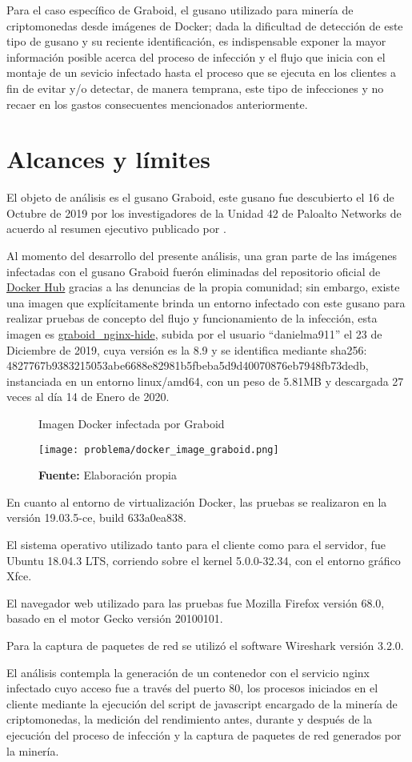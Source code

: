 \documentclass[../main/main.tex]{subfiles}
\begin{document}
  Para el caso específico de Graboid, el gusano utilizado para minería de criptomonedas desde imágenes de Docker; dada la dificultad de detección de este tipo de gusano y su reciente identificación, es indispensable exponer la mayor información posible acerca del proceso de infección y el flujo que inicia con el montaje de un sevicio infectado hasta el proceso que se ejecuta en los clientes a fin de evitar y/o detectar, de manera temprana, este tipo de infecciones y no recaer en los gastos consecuentes mencionados anteriormente.

  \section{Alcances y límites}

  El objeto de análisis es el gusano Graboid, este gusano fue descubierto el 16 de Octubre de 2019 por los investigadores de la Unidad 42 de Paloalto Networks de acuerdo al resumen ejecutivo publicado por \cite{web:graboid_paloalto}.

  Al momento del desarrollo del presente análisis, una gran parte de las imágenes infectadas con el gusano Graboid fuerón eliminadas del repositorio oficial de \href{https://hub.docker.com/}{Docker Hub} gracias a las denuncias de la propia comunidad; sin embargo, existe una imagen que explícitamente brinda un entorno infectado con este gusano para realizar pruebas de concepto del flujo y funcionamiento de la infección, esta imagen es \href{https://hub.docker.com/r/danielma911/graboid\_nginx-hide}{graboid\_nginx-hide}, subida por el usuario ``danielma911'' el 23 de Diciembre de 2019, cuya versión es la 8.9 y se identifica mediante sha256: 4827767b9383215053abe6688e82981b5fbeba5d9d40070876eb7948fb73dedb, instanciada en un entorno linux/amd64, con un peso de 5.81MB y descargada 27 veces al día 14 de Enero de 2020.

  \begin{figure}[ht]
    \centering
    \caption{Imagen Docker infectada por Graboid}
    \texttt{[image: problema/docker\_image\_graboid.png]}
    \caption*{\textbf{Fuente:} Elaboración propia}
  \end{figure}

  En cuanto al entorno de virtualización Docker, las pruebas se realizaron en la versión 19.03.5-ce, build 633a0ea838.

  El sistema operativo utilizado tanto para el cliente como para el servidor, fue Ubuntu 18.04.3 LTS, corriendo sobre el kernel 5.0.0-32.34, con el entorno gráfico Xfce.

  El navegador web utilizado para las pruebas fue Mozilla Firefox versión 68.0, basado en el motor Gecko versión 20100101.

  Para la captura de paquetes de red se utilizó el software Wireshark versión 3.2.0.

  El análisis contempla la generación de un contenedor con el servicio nginx infectado cuyo acceso fue a través del puerto 80, los procesos iniciados en el cliente mediante la ejecución del script de javascript encargado de la minería de criptomonedas, la medición del rendimiento antes, durante y después de la ejecución del proceso de infección y la captura de paquetes de red generados por la minería.
\end{document}
